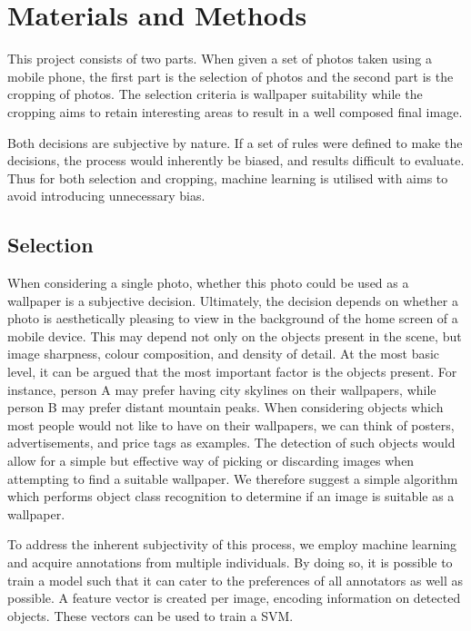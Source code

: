 %
\newpage
\chapter{Materials and Methods}

This project consists of two parts. When given a set of photos taken using a
mobile phone, the first part is the selection of photos and the second part is
the cropping of photos.
The selection criteria is wallpaper suitability while the cropping aims to
retain interesting areas to result in a well composed final image.

Both decisions are subjective by nature.
If a set of rules were defined to make the decisions, the process would
inherently be biased, and results difficult to evaluate.
Thus for both selection and cropping, machine learning is utilised with aims to
avoid introducing unnecessary bias.


\section{Selection\label{sec:meth_selection}}

When considering a single photo, whether this photo could be used as a wallpaper is a subjective decision.
Ultimately, the decision depends on whether a photo is aesthetically pleasing to view in the background of the home screen of a mobile device.
This may depend not only on the objects present in the scene, but image sharpness, colour composition, and density of detail.
At the most basic level, it can be argued that the most important factor is the objects present.
For instance, person A may prefer having city skylines on their wallpapers, while person B may prefer distant mountain peaks.
When considering objects which most people would not like to have on their wallpapers, we can think of posters, advertisements, and price tags as examples.
The detection of such objects would allow for a simple but effective way of picking or discarding images when attempting to find a suitable wallpaper.
We therefore suggest a simple algorithm which performs object class recognition to determine if an image is suitable as a wallpaper.

To address the inherent subjectivity of this process, we employ machine learning and acquire annotations from multiple individuals.
By doing so, it is possible to train a model such that it can cater to the preferences of all annotators as well as possible.
A feature vector is created per image, encoding information on detected objects.
These vectors can be used to train a SVM.

